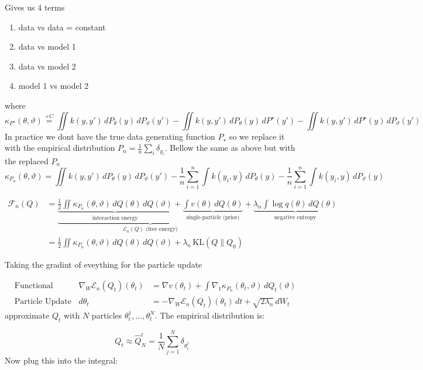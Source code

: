 \documentclass[mstat,12pt]{unswthesis}
\begin{document}
Gives us 4 terms
\begin{enumerate}
    \item data vs data = constant
    \item data vs model 1
    \item data vs model 2
    \item model 1 vs model 2
\end{enumerate}
where
$$\kappa_{P^\star}(\theta, \vartheta) \stackrel{+C}{=} \iint k(y,y') \, dP_\theta(y) \, dP_\vartheta(y') - \iint k(y,y') \, dP_\theta(y) \, dP^\star(y') - \iint k(y,y') \, dP^\star(y) \, dP_\vartheta(y')$$
In practice we dont have the true data generating function $P_\star$ so we replace it with the empirical distribution $P_n = \frac{1}{n}\sum_i\delta_{y_i}$. Bellow the same as above but with the replaced $P_n$
$$\kappa_{P_n}(\theta, \vartheta) = \iint k(y,y') \, dP_\theta(y) \, dP_\vartheta(y') - \frac{1}{n}\sum_{i=1}^n \int k(y_i, y) \, dP_\theta(y) - \frac{1}{n}\sum_{i=1}^n \int k(y_i, y) \, dP_\vartheta(y)$$

\begin{align}
    \mathcal{F}_n(Q) & = \underbrace{ \underbrace{\frac{1}{2} \iint \kappa_{P_n}(\theta, \vartheta) \, dQ(\theta) \, dQ(\vartheta)}_{\text{interaction energy}} + \underbrace{\int v(\theta) \, dQ(\theta)}_{\text{single-particle (prior)}} }_{\mathcal{E}_n(Q) \text{ (free energy)}} + \underbrace{\lambda_n \int \log q(\theta) \, dQ(\theta)}_{\text{negative entropy}} \\
                     & = \frac{1}{2}\iint \kappa_{P_n}(\theta, \vartheta)\, dQ(\theta)\, dQ(\vartheta) + \lambda_n\, \text{KL}(Q \| Q_0)
\end{align}

Taking the gradint of eveything for the particle update

$$
    \begin{aligned}
         & \text{Functional Gradient:} \quad   & \nabla_W \mathcal{E}_n(Q_t)(\theta_t) & = \nabla v(\theta_t) + \int \nabla_1 \kappa_{P_n}(\theta_t, \vartheta) \, dQ_t(\vartheta) \\[12pt]
         & \text{Particle Update (SDE):} \quad & d\theta_t                             & = -\nabla_W \mathcal{E}_n(Q_t)(\theta_t) \, dt + \sqrt{2\lambda_n} \, dW_t
    \end{aligned}$$
approximate $Q_t$ with $N$ particles $\theta^1_t, \dots, \theta^N_t$. The empirical distribution is:


$$Q_t \approx \hat{Q}^t_N = \frac{1}{N}\sum_{j=1}^N \delta_{\theta^j_t}$$
Now plug this into the integral:
\end{document}
